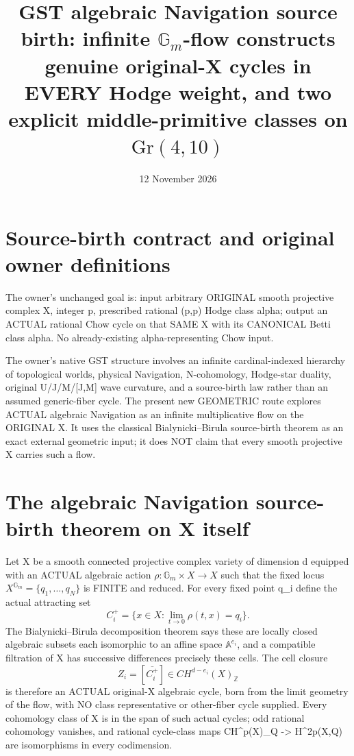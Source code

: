 \documentclass[11pt]{article}
\title{GST algebraic Navigation source birth: infinite \(\mathbb G_m\)-flow constructs genuine original-X cycles in EVERY Hodge weight, and two explicit middle-primitive classes on \(\mathrm{Gr}(4,10)\)}
\date{12 November 2026}
\begin{document}
\maketitle

\section{Source-birth contract and original owner definitions}
The owner's unchanged goal is: input arbitrary ORIGINAL smooth projective
complex X, integer p, prescribed rational (p,p) Hodge class alpha;
output an ACTUAL rational Chow cycle on that SAME X with its CANONICAL
Betti class alpha. No already-existing alpha-representing Chow input.

The owner's native GST structure involves an infinite cardinal-indexed
hierarchy of topological worlds, physical Navigation, N-cohomology,
Hodge-star duality, original U/J/M/[J,M] wave curvature,
and a source-birth law rather than an assumed generic-fiber cycle.
The present new GEOMETRIC route explores ACTUAL algebraic
Navigation as an infinite multiplicative flow on the ORIGINAL X.
It uses the classical Bialynicki--Birula source-birth theorem
as an exact external geometric input; it does NOT claim
that every smooth projective X carries such a flow.

\section{The algebraic Navigation source-birth theorem on X itself}
Let X be a smooth connected projective complex variety of
dimension d equipped with an ACTUAL algebraic action
\(\rho:\mathbb G_m\times X\to X\) such that the fixed locus
\(X^{\mathbb G_m}=\{q_1,\ldots,q_N\}\) is FINITE and reduced.
For every fixed point q_i define the actual attracting set
\[
\boxed{
C_i^+=\{x\in X:\lim_{t\to0} \rho(t,x)=q_i\}.
}
\]
The Bialynicki--Birula decomposition theorem says these are
locally closed algebraic subsets each isomorphic to an
affine space \(\mathbb A^{e_i}\), and a compatible filtration
of X has successive differences precisely these cells.
The cell closure
\[
\boxed{Z_i=[\overline{C_i^+}]\in CH^{d-e_i}(X)_{\mathbb Z}}
\]
is therefore an ACTUAL original-X algebraic cycle,
born from the limit geometry of the flow, with
NO class representative or other-fiber cycle supplied.
Every cohomology class of X is in the span of such
actual cycles; odd rational cohomology vanishes, and
rational cycle-class maps CH^p(X)_Q -> H^{2p}(X,Q)
are isomorphisms in every codimension.
\end{document}
